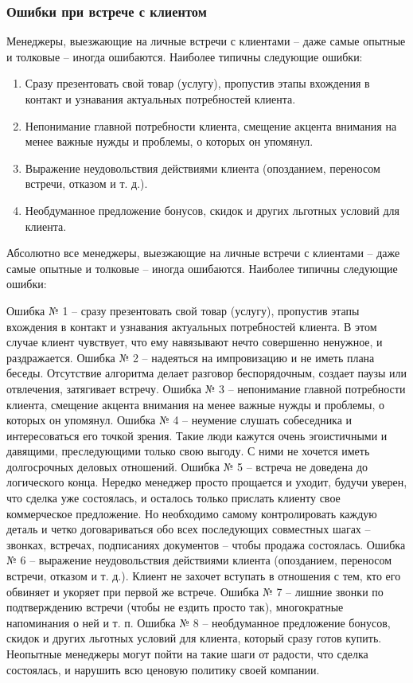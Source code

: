 \documentclass{../industrial-development}
\begin{document}
\begin{frame} \frametitle{Ошибки при встрече с клиентом}
Менеджеры, выезжающие на личные встречи с клиентами – даже самые опытные и толковые – иногда ошибаются. Наиболее типичны следующие ошибки:
\begin{enumerate}

		\item Сразу презентовать свой товар (услугу), пропустив этапы вхождения в контакт и узнавания актуальных потребностей клиента. 
		\item Непонимание главной потребности клиента, смещение акцента внимания на менее важные нужды и проблемы, о которых он упомянул.
	 	\item Выражение неудовольствия действиями клиента (опозданием, переносом встречи, отказом и т. д.).
		\item Необдуманное предложение бонусов, скидок и других льготных условий для клиента.
	 
\end{enumerate}
\end{frame}
\lecturenotes
Абсолютно все менеджеры, выезжающие на личные встречи с клиентами – даже самые опытные и толковые – иногда ошибаются. Наиболее типичны следующие ошибки: 

Ошибка № 1 – сразу презентовать свой товар (услугу), пропустив этапы вхождения в контакт и узнавания актуальных потребностей клиента. В этом случае клиент чувствует, что ему навязывают нечто совершенно ненужное, и раздражается. 
Ошибка № 2 – надеяться на импровизацию и не иметь плана беседы. Отсутствие алгоритма делает разговор беспорядочным, создает паузы или отвлечения, затягивает встречу. 
Ошибка № 3 – непонимание главной потребности клиента, смещение акцента внимания на менее важные нужды и проблемы, о которых он упомянул. 
Ошибка № 4 – неумение слушать собеседника и интересоваться его точкой зрения. Такие люди кажутся очень эгоистичными и давящими, преследующими только свою выгоду. С ними не хочется иметь долгосрочных деловых отношений. 
Ошибка № 5 – встреча не доведена до логического конца. Нередко менеджер просто прощается и уходит, будучи уверен, что сделка уже состоялась, и осталось только прислать клиенту свое коммерческое предложение. Но необходимо самому контролировать каждую деталь и четко договариваться обо всех последующих совместных шагах – звонках, встречах, подписаниях документов – чтобы продажа состоялась. 
Ошибка № 6 – выражение неудовольствия действиями клиента (опозданием, переносом встречи, отказом и т. д.). Клиент не захочет вступать в отношения с тем, кто его обвиняет и укоряет при первой же встрече. 
Ошибка № 7 – лишние звонки по подтверждению встречи (чтобы не ездить просто так), многократные напоминания о ней и т. п. 
Ошибка № 8 – необдуманное предложение бонусов, скидок и других льготных условий для клиента, который сразу готов купить. Неопытные менеджеры могут пойти на такие шаги от радости, что сделка состоялась, и нарушить всю ценовую политику своей компании.
\end{document}
